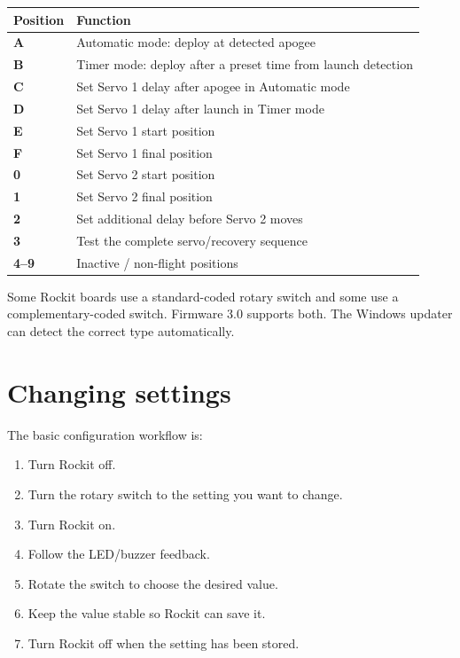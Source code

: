 \documentclass[11pt,a4paper]{article}
\begin{document}
\begin{table}[H]
\centering
\begin{tabularx}{\textwidth}{>{\centering\arraybackslash\bfseries}p{1.4cm} X}
\toprule
Position & Function \\
\midrule
A & Automatic mode: deploy at detected apogee \\
B & Timer mode: deploy after a preset time from launch detection \\
C & Set Servo 1 delay after apogee in Automatic mode \\
D & Set Servo 1 delay after launch in Timer mode \\
E & Set Servo 1 start position \\
F & Set Servo 1 final position \\
0 & Set Servo 2 start position \\
1 & Set Servo 2 final position \\
2 & Set additional delay before Servo 2 moves \\
3 & Test the complete servo/recovery sequence \\
4--9 & Inactive / non-flight positions \\
\bottomrule
\end{tabularx}
\end{table}

\begin{importantbox}
Some Rockit boards use a standard-coded rotary switch and some use a complementary-coded switch. Firmware 3.0 supports both. The Windows updater can detect the correct type automatically.
\end{importantbox}

\section{Changing settings}

The basic configuration workflow is:

\begin{enumerate}
    \item Turn Rockit off.
    \item Turn the rotary switch to the setting you want to change.
    \item Turn Rockit on.
    \item Follow the LED/buzzer feedback.
    \item Rotate the switch to choose the desired value.
    \item Keep the value stable so Rockit can save it.
    \item Turn Rockit off when the setting has been stored.
\end{enumerate}
\end{document}
